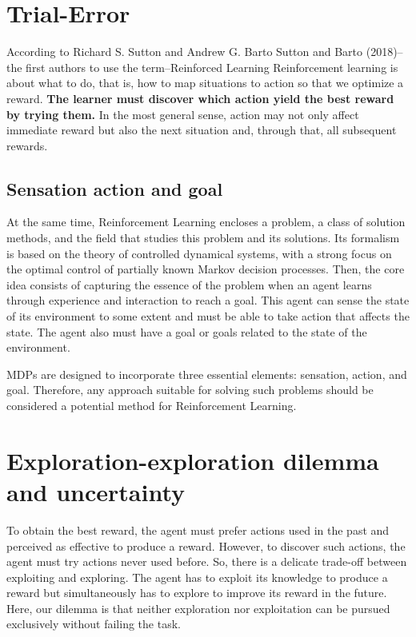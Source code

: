 \documentclass[
  letterpaper,
  DIV=11,
  numbers=noendperiod]{scrreprt}
\theoremstyle{definition}
\theoremstyle{remark}
\begin{document}
\section{Trial-Error}\label{trial-error}

According to Richard S. Sutton and Andrew G. Barto Sutton and Barto
(2018)--the first authors to use the term--Reinforced Learning
Reinforcement learning is about what to do, that is, how to map
situations to action so that we optimize a reward. \textbf{The learner
must discover which action yield the best reward by trying them.} In the
most general sense, action may not only affect immediate reward but also
the next situation and, through that, all subsequent rewards.

\subsection{Sensation action and goal}\label{sensation-action-and-goal}

At the same time, Reinforcement Learning encloses a problem, a class of
solution methods, and the field that studies this problem and its
solutions. Its formalism is based on the theory of controlled dynamical
systems, with a strong focus on the optimal control of partially known
Markov decision processes. Then, the core idea consists of capturing the
essence of the problem when an agent learns through experience and
interaction to reach a goal. This agent can sense the state of its
environment to some extent and must be able to take action that affects
the state. The agent also must have a goal or goals related to the state
of the environment.

MDPs are designed to incorporate three essential elements: sensation,
action, and goal. Therefore, any approach suitable for solving such
problems should be considered a potential method for Reinforcement
Learning.

\section{Exploration-exploration dilemma and
uncertainty}\label{exploration-exploration-dilemma-and-uncertainty}

To obtain the best reward, the agent must prefer actions used in the
past and perceived as effective to produce a reward. However, to
discover such actions, the agent must try actions never used before. So,
there is a delicate trade-off between exploiting and exploring. The
agent has to exploit its knowledge to produce a reward but
simultaneously has to explore to improve its reward in the future. Here,
our dilemma is that neither exploration nor exploitation can be pursued
exclusively without failing the task.
\end{document}
